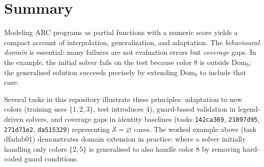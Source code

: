 \documentclass[11pt]{article}
\newcommand{\Domb}{\mathrm{Dom}_b}
\begin{document}
\section{Summary}

Modeling ARC programs as partial functions with a numeric score yields a compact account of interpolation, generalisation, and adaptation. The \emph{behavioural domain} is essential: many failures are not evaluation errors but \emph{coverage} gaps. In the example, the initial solver fails on the test because color $8$ is outside $\Domb$; the generalised solution succeeds precisely by extending $\Domb$ to include that case.

Several tasks in this repository illustrate these principles: adaptation to new colors (training uses $\{1,2,3\}$, test introduces $4$), guard-based validation in legend-driven solvers, and coverage gaps in identity baselines (tasks \texttt{142ca369}, \texttt{21897d95}, \texttt{271d71e2}, \texttt{da515329}) representing $\mathcal{S}=\varnothing$ cases. The worked example above (task dfadab01) demonstrates domain extension in practice: where a solver initially handling only colors $\{2,5\}$ is generalised to also handle color $8$ by removing hard-coded guard conditions.
\end{document}
